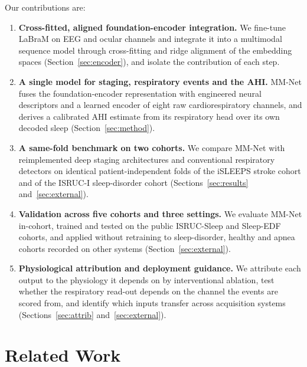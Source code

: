 \documentclass{ieeeaccess}
\begin{document}
Our contributions are:
\begin{enumerate}
\item \label{c:method}\textbf{Cross-fitted, aligned foundation-encoder integration.} We
fine-tune LaBraM on EEG and ocular channels and integrate it into a multimodal sequence model
through cross-fitting and ridge alignment of the embedding spaces (Section~\ref{sec:encoder}),
and isolate the contribution of each step.

\item \label{c:model}\textbf{A single model for staging, respiratory events and the AHI.}
MM-Net fuses the foundation-encoder representation with engineered neural descriptors and a
learned encoder of eight raw cardiorespiratory channels, and derives a calibrated AHI estimate from
its respiratory head over its own decoded sleep (Section~\ref{sec:method}).

\item \label{c:stroke}\textbf{A same-fold benchmark on two cohorts.} We compare MM-Net with
reimplemented deep staging architectures and conventional respiratory detectors on identical
patient-independent folds of the iSLEEPS stroke cohort and of the ISRUC-I sleep-disorder cohort
(Sections~\ref{sec:results} and~\ref{sec:external}).

\item \label{c:cohorts}\textbf{Validation across five cohorts and three settings.} We evaluate
MM-Net in-cohort, trained and tested on the public ISRUC-Sleep and Sleep-EDF cohorts, and applied
without retraining to sleep-disorder, healthy and apnea cohorts recorded on other systems
(Section~\ref{sec:external}).

\item \label{c:physio}\textbf{Physiological attribution and deployment guidance.} We attribute
each output to the physiology it depends on by interventional ablation, test whether the
respiratory read-out depends on the channel the events are scored from, and identify which inputs
transfer across acquisition systems (Sections~\ref{sec:attrib} and~\ref{sec:external}).
\end{enumerate}

\section{Related Work}
\label{sec:related}
\end{document}
